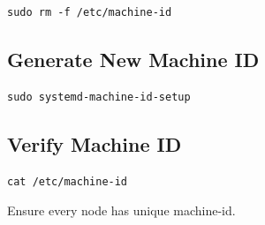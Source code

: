\documentclass[11pt]{article}
\begin{document}
\begin{verbatim}
sudo rm -f /etc/machine-id
\end{verbatim}
\subsection{Generate New Machine ID}
\label{sec:org15d146e}

\begin{verbatim}
sudo systemd-machine-id-setup
\end{verbatim}
\subsection{Verify Machine ID}
\label{sec:orgb614ea5}

\begin{verbatim}
cat /etc/machine-id
\end{verbatim}

Ensure every node has unique machine-id.
\end{document}
